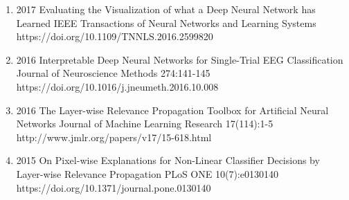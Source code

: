 \documentclass[10pt,a4paper]{article} %
\begin{document}
{\begin{enumerate}
    \item[] 
                        {2017}
                        {Evaluating the Visualization of what a Deep Neural Network has Learned}
                        {IEEE Transactions of Neural Networks and Learning Systems}
                        {}
                        {https://doi.org/10.1109/TNNLS.2016.2599820}

    \item[] 
                        {2016}
                        {Interpretable Deep Neural Networks for Single-Trial EEG Classification}
                        {Journal of Neuroscience Methods}
                        {274:141-145}
                        {https://doi.org/10.1016/j.jneumeth.2016.10.008}

    \item[] 
                        {2016}
                        {The Layer-wise Relevance Propagation Toolbox for Artificial Neural Networks}
                        {Journal of Machine Learning Research}
                        {17(114):1-5}
                        {http://www.jmlr.org/papers/v17/15-618.html}

    \item[] 
                        {2015}
                        {On Pixel-wise Explanations for Non-Linear Classifier Decisions by Layer-wise Relevance Propagation}
                        {PLoS ONE}
                        {10(7):e0130140}
                        {https://doi.org/10.1371/journal.pone.0130140}
\end{enumerate}
}
\end{document}
